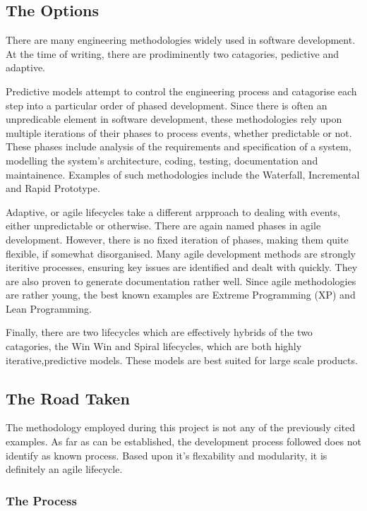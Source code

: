 
\subsection{The Options}

There are many engineering methodologies widely used in software
development. At the time of writing, there are prodiminently two
catagories, pedictive and adaptive.


Predictive models attempt to control the engineering process and
catagorise each step into a particular order of phased development. 
Since there is often an unpredicable element in software development, 
these methodologies rely upon multiple iterations of their phases to 
process events, whether predictable or not. These phases include 
analysis of the requirements and specification of a system, modelling 
the system's architecture, coding, testing, documentation and 
maintainence. Examples of such methodologies include the Waterfall, 
Incremental and Rapid Prototype.


Adaptive, or agile lifecycles take a different arpproach to dealing 
with events, either unpredictable or otherwise. There are again named 
phases in agile development. However, there is no fixed iteration of 
phases, making them quite flexible, if somewhat disorganised. Many 
agile development methods are strongly iteritive processes, ensuring key 
issues are identified and dealt with quickly. They are also proven to
generate documentation rather well. Since agile methodologies are rather 
young, the best known examples are Extreme Programming (XP) and Lean 
Programming.


Finally, there are two lifecycles which are effectively hybrids of the
two catagories, the Win Win and Spiral lifecycles, which are both highly
iterative,predictive models. These models are best suited for large
scale products.

\subsection{The Road Taken}

The methodology employed during this project is not any of the
previously cited examples. As far as can be established, the development
process followed does not identify as known process. Based upon it's
flexability and modularity, it is definitely an agile lifecycle.

\subsubsection{The Process}


